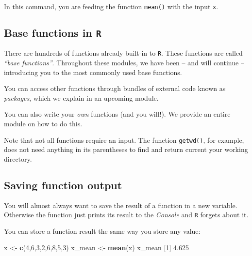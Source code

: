 \documentclass[
]{book}
\newenvironment{Shaded}{\begin{snugshade}}{\end{snugshade}}
\newcommand{\DecValTok}[1]{\textcolor[rgb]{0.00,0.00,0.81}{#1}}
\newcommand{\FloatTok}[1]{\textcolor[rgb]{0.00,0.00,0.81}{#1}}
\newcommand{\KeywordTok}[1]{\textcolor[rgb]{0.13,0.29,0.53}{\textbf{#1}}}
\newcommand{\NormalTok}[1]{#1}
\newcommand{\StringTok}[1]{\textcolor[rgb]{0.31,0.60,0.02}{#1}}
\begin{document}
In this command, you are feeding the function \texttt{mean()} with the input \texttt{x}.

\hypertarget{base-functions-in-r}{%
\subsection*{\texorpdfstring{Base functions in \texttt{R}}{Base functions in R}}\label{base-functions-in-r}}

There are hundreds of functions already built-in to \texttt{R}. These functions are called \emph{``base functions''}. Throughout these modules, we have been -- and will continue -- introducing you to the most commonly used base functions.

You can access other functions through bundles of external code known as \emph{packages}, which we explain in an upcoming module.

You can also write your \emph{own} functions (and you will!). We provide an entire module on how to do this.

Note that not all functions require an input. The function \texttt{getwd()}, for example, does not need anything in its parentheses to find and return current your working directory.

\hypertarget{saving-function-output}{%
\subsection*{Saving function output}\label{saving-function-output}}

You will almost always want to save the result of a function in a new variable. Otherwise the function just prints its result to the \emph{Console} and \texttt{R} forgets about it.

You can store a function result the same way you store any value:

\begin{Shaded}
\begin{Highlighting}[]
\NormalTok{x <-}\StringTok{ }\KeywordTok{c}\NormalTok{(}\DecValTok{4}\NormalTok{,}\DecValTok{6}\NormalTok{,}\DecValTok{3}\NormalTok{,}\DecValTok{2}\NormalTok{,}\DecValTok{6}\NormalTok{,}\DecValTok{8}\NormalTok{,}\DecValTok{5}\NormalTok{,}\DecValTok{3}\NormalTok{) }
\NormalTok{x_mean <-}\StringTok{ }\KeywordTok{mean}\NormalTok{(x) }
\NormalTok{x_mean}
\NormalTok{[}\DecValTok{1}\NormalTok{] }\FloatTok{4.625}
\end{Highlighting}
\end{Shaded}
\end{document}
